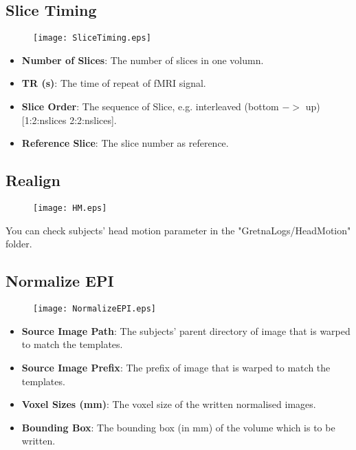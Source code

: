 \documentclass[11pt]{article}
\begin{document}
		\subsection{Slice Timing}
			\begin{figure}
				\begin{center}
					\texttt{[image: SliceTiming.eps]}
				\end{center}
			\end{figure}
			\begin{itemize}
				\item \textbf{Number of Slices}: The number of slices in one volumn.
				\item \textbf{TR (s)}: The time of repeat of fMRI signal.
				\item \textbf{Slice Order}: The sequence of Slice, e.g. interleaved (bottom $->$ up) [1:2:nslices 2:2:nslices].
				\item \textbf{Reference Slice}: The slice number as reference.
			\end{itemize}
		\subsection{Realign}
			\begin{figure}
				\begin{center}
					\texttt{[image: HM.eps]}
				\end{center}
			\end{figure}
			You can check subjects' head motion parameter in the "GretnaLogs/HeadMotion" folder.
		\subsection{Normalize EPI}
			\begin{figure}
				\begin{center}
					\texttt{[image: NormalizeEPI.eps]}
				\end{center}
			\end{figure}
			\begin{itemize}
				\item \textbf{Source Image Path}: The subjects' parent directory of image that is warped to match the templates.
				\item \textbf{Source Image Prefix}: The prefix of image that is warped to match the templates.
			\end{itemize}
			\begin{itemize}
				\item \textbf{Voxel Sizes (mm)}: The voxel size of the written normalised images.
				\item \textbf{Bounding Box}: The bounding box (in mm) of the volume which is to be written. 
			\end{itemize}
\end{document}
